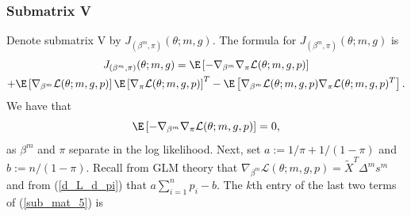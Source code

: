\documentclass[11pt]{article}
\begin{document}
\begin{appendices}
\begin{refsection}
\subsubsection*{Submatrix V}
Denote submatrix V by $J_{(\beta^m,\pi)}(\theta; m, g).$ The formula for $J_{(\beta^m,\pi)}(\theta; m, g)$ is
\begin{multline}\label{sub_mat_5}
J_{(\beta^m,\pi)}(\theta; m, g) = \E \left[ - \nabla_{\beta^m} \nabla_{ \pi } \mathcal{L}(\theta; m, g, p) \right] \\ + \E\left[ \nabla_{\beta^m}\mathcal{L}(\theta ; m,g,p) \right] \E \left[ \nabla_{\pi}\mathcal{L}(\theta ; m,g,p) \right]^T  - \E \left[ \nabla_{\beta^m}\mathcal{L}(\theta; m,g,p) \nabla_{\pi}\mathcal{L}(\theta; m,g,p)^T \right].
\end{multline}
We have that
\begin{equation}\label{sub_mat_5_1}
\E \left[ - \nabla_{\beta^m} \nabla_{ \pi } \mathcal{L}(\theta; m, g, p) \right] = 0,
\end{equation}
as $\beta^m$ and $\pi$ separate in the log likelihood. Next, set $a := 1/\pi + 1/(1 - \pi)$ and $b := n/(1 - \pi).$ Recall from GLM theory that
$\nabla_{\beta^m} \mathcal{L}(\theta; m, g, p) = \tilde{X}^T \Delta^m s^m$ and from (\ref{d_L_d_pi}) that
$a \sum_{i=1}^n p_i - b.$
The $k$th entry of the last two terms of (\ref{sub_mat_5}) is
\begin{multline}\label{sub_mat_5_2}

\end{multline}
\end{refsection}
\end{appendices}
\end{document}
